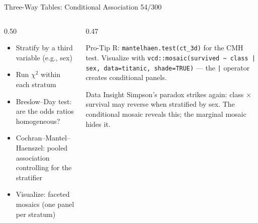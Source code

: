 \documentclass[10pt]{beamer}
\newcommand{\smark}[1]{\hfill{\scriptsize\color{codegray}#1}}
\begin{document}
\begin{frame}{Three-Way Tables: Conditional Association}
\smark{54/300}
\begin{columns}[T]
\begin{column}{0.50\textwidth}
\begin{itemize}
    \item Stratify by a third variable (e.g., sex)
    \item Run $\chi^2$ within each stratum
    \item Breslow--Day test: are the odds ratios homogeneous?
    \item Cochran--Mantel--Haenszel: pooled association controlling for the stratifier
    \item Visualize: faceted mosaics (one panel per stratum)
\end{itemize}
\end{column}
\begin{column}{0.47\textwidth}
\begin{alertblock}{Pro-Tip}
    \scriptsize R: \texttt{mantelhaen.test(ct\_3d)} for the CMH test. Visualize with \texttt{vcd::mosaic(survived \textasciitilde\ class | sex, data=titanic, shade=TRUE)} --- the \texttt{|} operator creates conditional panels.
\end{alertblock}
\vspace{0.1cm}
\begin{exampleblock}{Data Insight}
    \scriptsize Simpson's paradox strikes again: class $\times$ survival may reverse when stratified by sex. The conditional mosaic reveals this; the marginal mosaic hides it.
\end{exampleblock}
\end{column}
\end{columns}
\end{frame}
\end{document}
